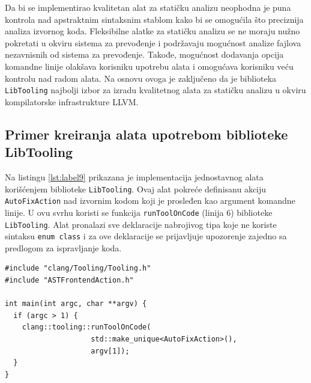 \documentclass[12pt,oneside]{memoir}
\begin{document}
Da bi se implementirao kvalitetan alat za stati\v{c}ku analizu neophodna je puna kontrola nad apstraktnim sintaksnim stablom kako bi se omogu\'{c}ila \v{s}to preciznija analiza izvornog koda. Fleksibilne alatke za stati\v{c}ku analizu se ne moraju nu\v{z}no pokretati u okviru sistema za prevođenje i podr\v{z}avaju mogu\'{c}nost analize fajlova nezavnisnih od sistema za prevođenje. Takođe, mogu\'{c}nost dodavanja opcija komandne linije olak\v{s}ava korisniku upotrebu alata i omogu\'{c}ava korisniku ve\'{c}u kontrolu nad radom alata. Na osnovu ovoga je zaklju\v{c}eno da je biblioteka \texttt{LibTooling} najbolji izbor za izradu kvalitetnog alata za stati\v{c}ku analizu u okviru kompilatorske infrastrukture LLVM.

\subsection{Primer kreiranja alata upotrebom biblioteke LibTooling}

Na listingu \ref{lst:label9} prikazana je implementacija jednostavnog alata kori\v{s}\'{c}enjem biblioteke \texttt{LibTooling}. Ovaj alat pokre\'{c}e definisanu akciju \texttt{AutoFixAction} nad izvornim kodom koji je prosleđen kao argument komandne linije. U ovu svrhu koristi se funkcija \texttt{runToolOnCode} (linija 6) biblioteke \texttt{LibTooling}. Alat pronalazi sve deklaracije nabrojivog tipa koje ne koriste sintaksu \texttt{enum class} i za ove deklaracije se prijavljuje upozorenje zajedno sa predlogom za ispravljanje koda. 

\begin{lstlisting}[style=customc,  caption={Primer implementacije jednostavnog alata upotrebom biblioteke \texttt{LibTooling}. Alat koristi klasu \texttt{AutoFixAction} sa listinga \ref{lst:ASTAction} dostupnom kroz zaglavlje \texttt{ASTFrontendAction.h}.}, label=lst:label9]
#include "clang/Tooling/Tooling.h"
#include "ASTFrontendAction.h"

int main(int argc, char **argv) {
  if (argc > 1) {
    clang::tooling::runToolOnCode(
                    std::make_unique<AutoFixAction>(),
                    argv[1]);
  }
}
\end{lstlisting}
\end{document}
